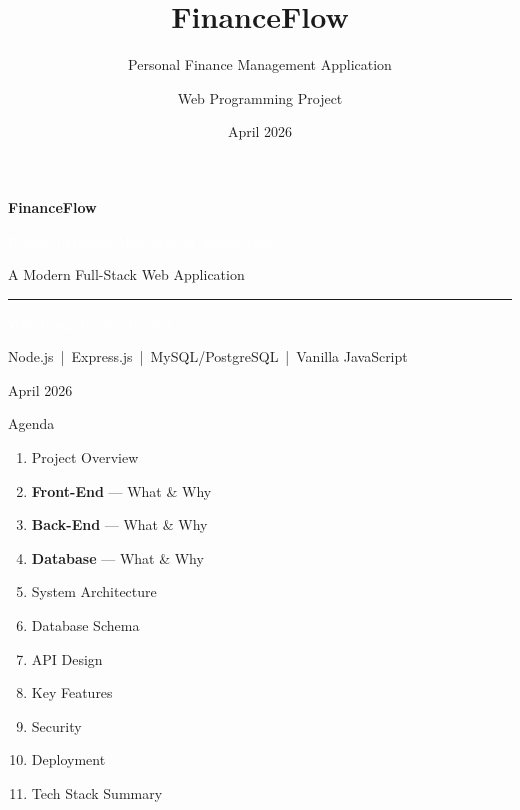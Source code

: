 \documentclass[aspectratio=169, 12pt]{beamer}
\title{FinanceFlow}
\subtitle{Personal Finance Management Application}
\author{Web Programming Project}
\date{April 2026}
\begin{document}
{
\begin{frame}[plain]
\begin{center}
\vspace{1.5cm}
{\Huge\bfseries\textcolor{primary}{FinanceFlow}}\par
\vspace{8pt}
{\large\textcolor{white}{Personal Finance Management Application}}\par
\vspace{6pt}
{\small\textcolor{gray!50}{A Modern Full-Stack Web Application}}\par
\vspace{1.2cm}
\textcolor{primary}{\rule{0.4\textwidth}{2pt}}\par
\vspace{1.2cm}
{\normalsize\textcolor{white}{Web Programming Project}}\par
\vspace{8pt}
{\small\textcolor{gray!50}{Node.js \,|\, Express.js \,|\, MySQL/PostgreSQL \,|\, Vanilla JavaScript}}\par
\vspace{8pt}
{\small\textcolor{gray!60}{April 2026}}\par
\end{center}
\end{frame}
}

\begin{frame}{Agenda}
\small
\begin{enumerate}\itemsep=6pt
    \item Project Overview
    \item \textbf{Front-End} --- What \& Why
    \item \textbf{Back-End} --- What \& Why
    \item \textbf{Database} --- What \& Why
    \item System Architecture
    \item Database Schema
    \item API Design
    \item Key Features
    \item Security
    \item Deployment
    \item Tech Stack Summary
\end{enumerate}
\end{frame}
\end{document}
